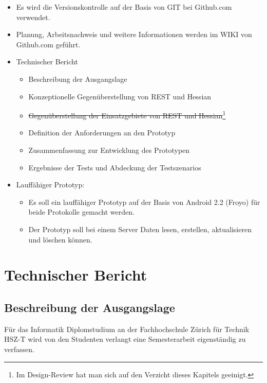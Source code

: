 \documentclass[listof=totocnumbered, bibliography=totocnumbered]{scrreprt}
\begin{document}
  \begin{itemize}
    \item Es wird die Versionskontrolle auf der Basis von GIT bei
          Github.com verwendet.
    \item Planung, Arbeitsnachweis und weitere Informationen werden im WIKI
          von Github.com geführt.
    \item Technischer Bericht
    \begin{itemize}
      \item Beschreibung der Ausgangslage
      \item Konzeptionelle Gegenüberstellung von \ac{REST} und Hessian
      \item \sout{Gegenüberstellung der Einsatzgebiete von \ac{REST} und
      Hessian}\footnote[4]{
        Im Design-Review hat man sich auf den Verzicht dieses Kapitels
        geeinigt.}
      \item Definition der Anforderungen an den Prototyp 
      \item Zusammenfassung zur Entwicklung des Prototypen
      \item Ergebnisse der Tests und Abdeckung der Testszenarios
    \end{itemize}
    \item Lauffähiger Prototyp:
    \begin{itemize}
      \item Es soll ein lauffähiger Prototyp auf der Basis von
            Android 2.2 (Froyo) für beide Protokolle gemacht werden.
      \item Der Prototyp soll bei einem Server Daten lesen, erstellen,
            aktualisieren und löschen können.
    \end{itemize}
  \end{itemize}
  
  \chapter{Technischer Bericht}
  
  
  \section{Beschreibung der Ausgangslage}
  
  Für das Informatik Diplomstudium an der Fachhochschule Zürich für Technik
  HSZ-T wird von den Studenten verlangt eine Semesterarbeit eigenständig zu
  verfassen.
  
\end{document}
